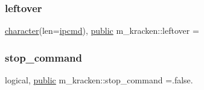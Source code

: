 \mbox{\label{namespacem__kracken_a012a1a99d749bbdcc4b9af483d09fec1}} 
\subsubsection{\texorpdfstring{leftover}{leftover}}
{\footnotesize\ttfamily \hyperlink{option__stopwatch_83_8txt_abd4b21fbbd175834027b5224bfe97e66}{character}(len=\hyperlink{namespacem__kracken_aa2cfa3076819f58387ffb774620027c2}{ipcmd}), \hyperlink{M__stopwatch_83_8txt_a2f74811300c361e53b430611a7d1769f}{public} m\+\_\+kracken\+::leftover =\textquotesingle{} \textquotesingle{}}

\mbox{\label{namespacem__kracken_a89f0eab0a97826df5108b9318a7bb345}} 
\subsubsection{\texorpdfstring{stop\+\_\+command}{stop\_command}}
{\footnotesize\ttfamily logical, \hyperlink{M__stopwatch_83_8txt_a2f74811300c361e53b430611a7d1769f}{public} m\+\_\+kracken\+::stop\+\_\+command =.false.}

